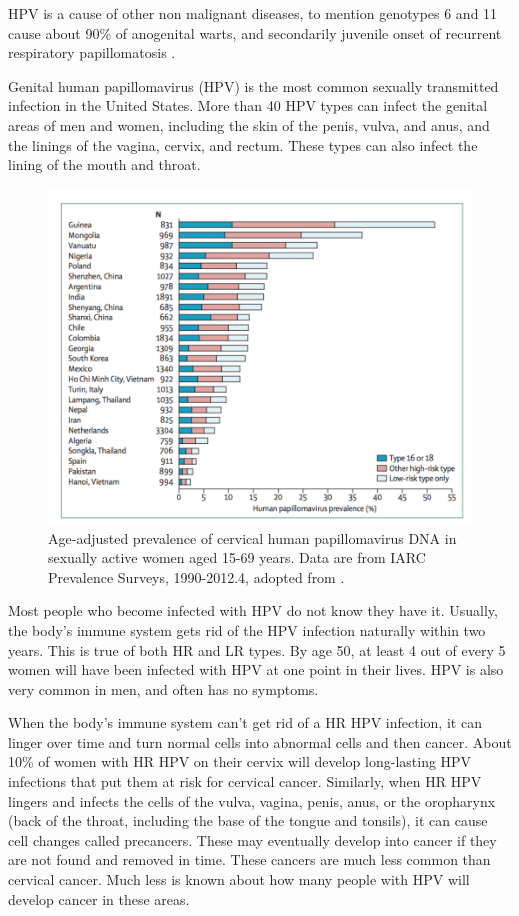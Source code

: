 HPV is a cause of other non malignant diseases, to mention genotypes 6 and 11 cause about 90\% of anogenital warts, and secondarily juvenile onset of recurrent respiratory papillomatosis \cite{lacey2006burden}.

Genital human papillomavirus (HPV) is the most common sexually transmitted infection in the United States. More than 40 HPV types can infect the genital areas of men and women, including the skin of the penis, vulva, and anus, and the linings of the vagina, cervix, and rectum. These types can also infect the lining of the mouth and throat.

\begin{figure}[ht]
	\centering
	\includegraphics[scale=0.7]{IMG/prevalence.png}
	\caption{Age-adjusted prevalence of cervical human papillomavirus DNA in sexually active women aged 15-69 years. Data are from IARC Prevalence Surveys, 1990-2012.4, adopted from \cite{Marx1986HumanPV}.}
	\label{ageAdjusted}
\end{figure} 


Most people who become infected with HPV do not know they have it. Usually, the body's immune system gets rid of the HPV infection naturally within two years. This is true of both HR and LR types. By age 50, at least 4 out of every 5 women will have been infected with HPV at one point in their lives. HPV is also very common in men, and often has no symptoms.

When the body's immune system can't get rid of a HR HPV infection, it can linger over time and turn normal cells into abnormal cells and then cancer. About 10\% of women with HR HPV on their cervix will develop long-lasting HPV infections that put them at risk for cervical cancer. Similarly, when HR HPV lingers and infects the cells of the vulva, vagina, penis, anus, or the oropharynx (back of the throat, including the base of the tongue and tonsils), it can cause cell changes called precancers. These may eventually develop into cancer if they are not found and removed in time. These cancers are much less common than cervical cancer. Much less is known about how many people with HPV will develop cancer in these areas.

